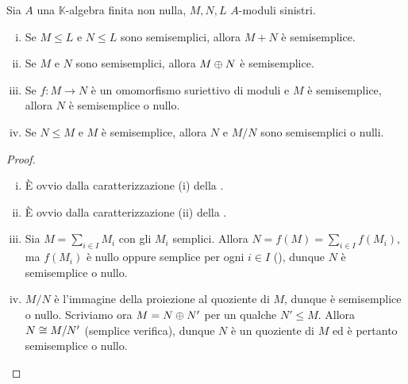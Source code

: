 \begin{proposition}
Sia $A$ una $\mathbb{K}$-algebra finita non nulla, $M,N,L$ $A$-moduli sinistri.
\begin{enumerate}[(i)]
\item Se $M\le L$ e $N\le L$ sono semisemplici, allora $M+N$ è semisemplice.
\item Se $M$ e $N$ sono semisemplici, allora $M\oplus N$ è semisemplice.
\item Se $f:M\to N$ è un omomorfismo suriettivo di moduli e $M$ è semisemplice, allora $N$ è semisemplice o nullo.
\item Se $N\le M$ e $M$ è semisemplice, allora $N$ e $M/N$ sono semisemplici o nulli.
\end{enumerate}
\end{proposition}
\begin{proof}
\leavevmode
\begin{enumerate}[(i)]
\item È ovvio dalla caratterizzazione (i) della .
\item È ovvio dalla caratterizzazione (ii) della .
\item Sia $M=\sum_{i\in I}M_i$ con gli $M_i$ semplici. Allora $N=f(M)=\sum_{i\in I}f(M_i)$, ma $f(M_i)$ è nullo oppure semplice per ogni $i\in I$ (), dunque $N$ è semisemplice o nullo.
\item $M/N$ è l'immagine della proiezione al quoziente di $M$, dunque è semisemplice o nullo. Scriviamo ora $M=N\oplus N'$ per un qualche $N'\le M$. Allora $N\cong M/N'$ (semplice verifica), dunque $N$ è un quoziente di $M$ ed è pertanto semisemplice o nullo.
\end{enumerate}

\end{proof}

